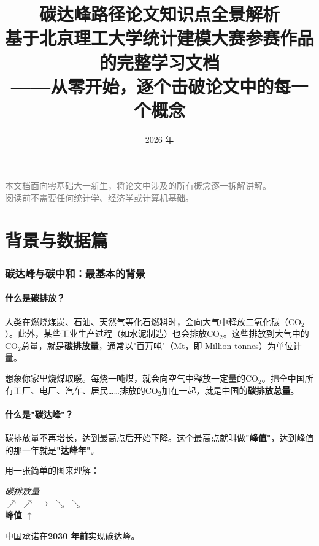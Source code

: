 \documentclass[12pt, a4paper]{article}
\title{\vspace{-1cm}\textbf{\Huge 碳达峰路径论文知识点全景解析} \\[0.5cm]
\large 基于北京理工大学统计建模大赛参赛作品的完整学习文档 \\[0.3cm]
\normalsize ——从零开始，逐个击破论文中的每一个概念}
\author{}
\date{2026 年}
\begin{document}
\maketitle
\begin{center}
\textcolor{gray}{\small 本文档面向零基础大一新生，将论文中涉及的所有概念逐一拆解讲解。\\
阅读前不需要任何统计学、经济学或计算机基础。}
\end{center}
\newpage
\tableofcontents
\newpage

\part{背景与数据篇}

\section{碳达峰与碳中和：最基本的背景}

\subsection{什么是碳排放？}

人类在燃烧煤炭、石油、天然气等化石燃料时，会向大气中释放二氧化碳（CO$_2$）。此外，某些工业生产过程（如水泥制造）也会排放CO$_2$。这些排放到大气中的CO$_2$总量，就是\textbf{碳排放量}，通常以"百万吨"（Mt，即 Million tonnes）为单位计量。

\begin{examplebox}[生活中的类比]
想象你家里烧煤取暖。每烧一吨煤，就会向空气中释放一定量的CO$_2$。把全中国所有工厂、电厂、汽车、居民……排放的CO$_2$加在一起，就是中国的\textbf{碳排放总量}。
\end{examplebox}

\subsection{什么是"碳达峰"？}

\begin{conceptbox}[碳达峰]
碳排放量不再增长，达到最高点后开始下降。这个最高点就叫做\textbf{"峰值"}，达到峰值的那一年就是\textbf{"达峰年"}。
\end{conceptbox}

用一张简单的图来理解：
\begin{center}
\textit{碳排放量} \\
 $\nearrow$ $\nearrow$ $\rightarrow$ $\searrow$ $\searrow$ \\
\hspace{1cm} \textbf{峰值} $\uparrow$ \end{center}
中国承诺在\textbf{2030 年前}实现碳达峰。
\end{document}
